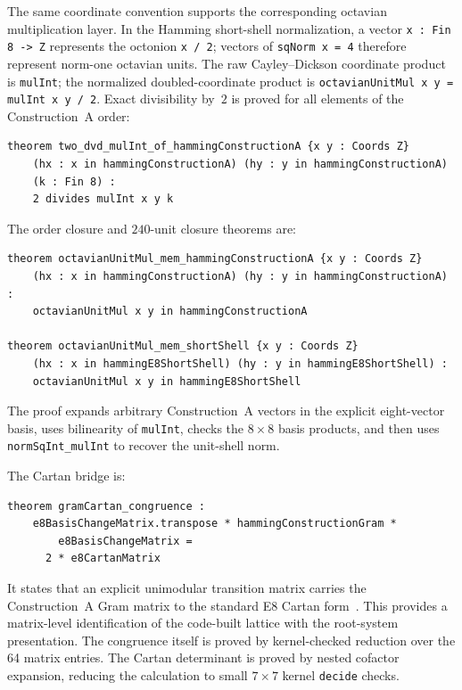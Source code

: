\documentclass[12pt]{article}
\theoremstyle{definition}
\newcommand{\lean}[1]{\texttt{#1}}
\begin{document}
The same coordinate convention supports the corresponding octavian
multiplication layer.  In the Hamming short-shell normalization, a vector
\lean{x : Fin 8 -> Z} represents the octonion \lean{x / 2}; vectors of
\lean{sqNorm x = 4} therefore represent norm-one octavian units.  The raw
Cayley--Dickson coordinate product is \lean{mulInt}; the normalized
doubled-coordinate product is \lean{octavianUnitMul x y = mulInt x y / 2}.
Exact divisibility by~$2$ is proved for all elements of the Construction~A
order:
\begin{lstlisting}[style=lean]
theorem two_dvd_mulInt_of_hammingConstructionA {x y : Coords Z}
    (hx : x in hammingConstructionA) (hy : y in hammingConstructionA)
    (k : Fin 8) :
    2 divides mulInt x y k
\end{lstlisting}
The order closure and $240$-unit closure theorems are:
\begin{lstlisting}[style=lean]
theorem octavianUnitMul_mem_hammingConstructionA {x y : Coords Z}
    (hx : x in hammingConstructionA) (hy : y in hammingConstructionA) :
    octavianUnitMul x y in hammingConstructionA

theorem octavianUnitMul_mem_shortShell {x y : Coords Z}
    (hx : x in hammingE8ShortShell) (hy : y in hammingE8ShortShell) :
    octavianUnitMul x y in hammingE8ShortShell
\end{lstlisting}
The proof expands arbitrary Construction~A vectors in the explicit eight-vector
basis, uses bilinearity of \lean{mulInt}, checks the $8\times 8$ basis products,
and then uses \lean{normSqInt\_mulInt} to recover the unit-shell norm.

The Cartan bridge is:
\begin{lstlisting}[style=lean]
theorem gramCartan_congruence :
    e8BasisChangeMatrix.transpose * hammingConstructionGram *
        e8BasisChangeMatrix =
      2 * e8CartanMatrix
\end{lstlisting}
It states that an explicit unimodular transition matrix carries the
Construction~A Gram matrix to the standard E8 Cartan form~\cite{Bourbaki2002}.
This provides a matrix-level identification of the code-built lattice with the
root-system presentation.  The congruence itself is proved by kernel-checked
reduction over the 64 matrix entries.  The Cartan determinant is proved by
nested cofactor expansion, reducing the calculation to small $7\times 7$ kernel
\lean{decide} checks.
\end{document}

